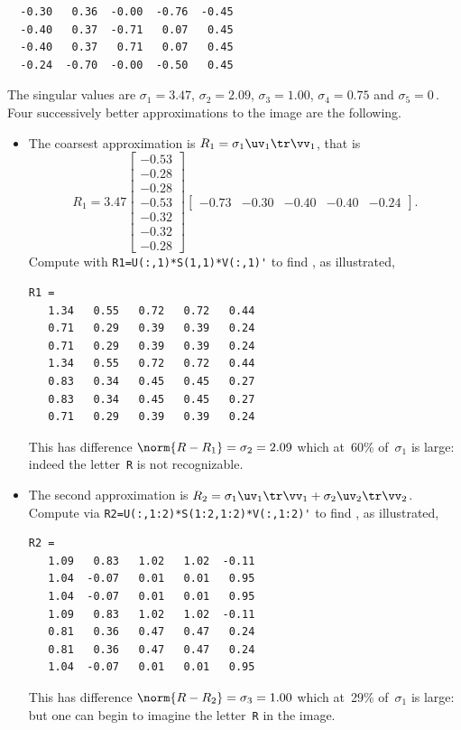 \begin{example}
\begin{solution}
\begin{verbatim}
  -0.30   0.36  -0.00  -0.76  -0.45
  -0.40   0.37  -0.71   0.07   0.45
  -0.40   0.37   0.71   0.07   0.45
  -0.24  -0.70  -0.00  -0.50   0.45
\end{verbatim}
\setbox\ajrqrbox\hbox{}%
\marginajrbox%
The singular values are \(\sigma_1=3.47\), \(\sigma_2=2.09\), \(\sigma_3=1.00\), \(\sigma_4=0.75\) and \(\sigma_5=0\)\,.
Four successively better approximations to the image are the following.
\begin{itemize}
\item  
The coarsest approximation is \(R_1=\sigma_1\uv_1\tr\vv_1\), that is
{\small\begin{equation*}
R_1=3.47
\begin{bmatrix} -0.53\\-0.28\\-0.28\\-0.53\\-0.32\\-0.32\\-0.28 \end{bmatrix}
\begin{bmatrix} -0.73&-0.30&-0.40&-0.40&-0.24 \end{bmatrix}.
\end{equation*}}%
Compute with \verb|R1=U(:,1)*S(1,1)*V(:,1)'| to find \twodp, as illustrated,
\marginpar{}
\begin{verbatim}
R1 =
   1.34   0.55   0.72   0.72   0.44
   0.71   0.29   0.39   0.39   0.24
   0.71   0.29   0.39   0.39   0.24
   1.34   0.55   0.72   0.72   0.44
   0.83   0.34   0.45   0.45   0.27
   0.83   0.34   0.45   0.45   0.27
   0.71   0.29   0.39   0.39   0.24
\end{verbatim}
This has difference \(\norm{R-R_1}=\sigma_2=2.09\) which at~60\% of~\(\sigma_1\) is large: indeed the letter~\verb|R| is not recognizable.

\item The second approximation is \(R_2=\sigma_1\uv_1\tr\vv_1+\sigma_2\uv_2\tr\vv_2\).
Compute via \verb|R2=U(:,1:2)*S(1:2,1:2)*V(:,1:2)'| to find \twodp, as illustrated, 
\marginpar{}
\begin{verbatim}
R2 =
   1.09   0.83   1.02   1.02  -0.11
   1.04  -0.07   0.01   0.01   0.95
   1.04  -0.07   0.01   0.01   0.95
   1.09   0.83   1.02   1.02  -0.11
   0.81   0.36   0.47   0.47   0.24
   0.81   0.36   0.47   0.47   0.24
   1.04  -0.07   0.01   0.01   0.95
\end{verbatim}
This has difference \(\norm{R-R_2}=\sigma_3=1.00\) which at~29\% of~\(\sigma_1\) is large: but one can begin to imagine the letter~\verb|R| in the image.
 

\end{itemize}
\end{solution}
\end{example}
